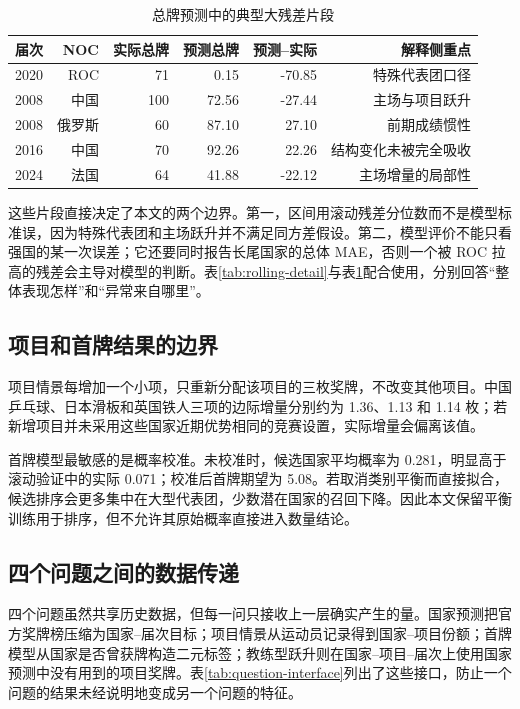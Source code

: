 \documentclass[UTF8,11pt,a4paper]{ctexart}
\begin{document}
\begin{table}[H]
\centering
\caption{总牌预测中的典型大残差片段}
\label{tab:large-residuals}
\small
\begin{tabular}{lrrrrr}
\toprule
届次 & NOC & 实际总牌 & 预测总牌 & 预测--实际 & 解释侧重点\\
\midrule
2020 & ROC & 71 & 0.15 & -70.85 & 特殊代表团口径\\
2008 & 中国 & 100 & 72.56 & -27.44 & 主场与项目跃升\\
2008 & 俄罗斯 & 60 & 87.10 & 27.10 & 前期成绩惯性\\
2016 & 中国 & 70 & 92.26 & 22.26 & 结构变化未被完全吸收\\
2024 & 法国 & 64 & 41.88 & -22.12 & 主场增量的局部性\\
\bottomrule
\end{tabular}
\end{table}

这些片段直接决定了本文的两个边界。第一，区间用滚动残差分位数而不是模型标准误，因为特殊代表团和主场跃升并不满足同方差假设。第二，模型评价不能只看强国的某一次误差；它还要同时报告长尾国家的总体 MAE，否则一个被 ROC 拉高的残差会主导对模型的判断。表\ref{tab:rolling-detail}与表\ref{tab:large-residuals}配合使用，分别回答“整体表现怎样”和“异常来自哪里”。

\subsection{项目和首牌结果的边界}

项目情景每增加一个小项，只重新分配该项目的三枚奖牌，不改变其他项目。中国乒乓球、日本滑板和英国铁人三项的边际增量分别约为 1.36、1.13 和 1.14 枚；若新增项目并未采用这些国家近期优势相同的竞赛设置，实际增量会偏离该值。

首牌模型最敏感的是概率校准。未校准时，候选国家平均概率为 0.281，明显高于滚动验证中的实际 0.071；校准后首牌期望为 5.08。若取消类别平衡而直接拟合，候选排序会更多集中在大型代表团，少数潜在国家的召回下降。因此本文保留平衡训练用于排序，但不允许其原始概率直接进入数量结论。

\subsection{四个问题之间的数据传递}

四个问题虽然共享历史数据，但每一问只接收上一层确实产生的量。国家预测把官方奖牌榜压缩为国家--届次目标；项目情景从运动员记录得到国家--项目份额；首牌模型从国家是否曾获牌构造二元标签；教练型跃升则在国家--项目--届次上使用国家预测中没有用到的项目奖牌。表\ref{tab:question-interface}列出了这些接口，防止一个问题的结果未经说明地变成另一个问题的特征。
\end{document}
